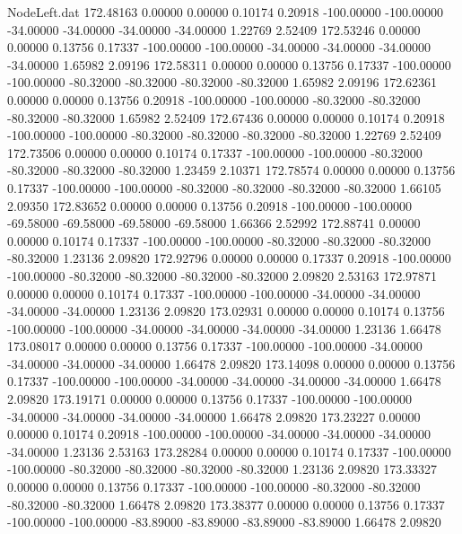 \begin{filecontents}{NodeLeft.dat}
 172.48163    0.00000    0.00000     0.10174    0.20918 -100.00000 -100.00000  -34.00000  -34.00000  -34.00000  -34.00000    1.22769    2.52409
 172.53246    0.00000    0.00000     0.13756    0.17337 -100.00000 -100.00000  -34.00000  -34.00000  -34.00000  -34.00000    1.65982    2.09196
 172.58311    0.00000    0.00000     0.13756    0.17337 -100.00000 -100.00000  -80.32000  -80.32000  -80.32000  -80.32000    1.65982    2.09196
 172.62361    0.00000    0.00000     0.13756    0.20918 -100.00000 -100.00000  -80.32000  -80.32000  -80.32000  -80.32000    1.65982    2.52409
 172.67436    0.00000    0.00000     0.10174    0.20918 -100.00000 -100.00000  -80.32000  -80.32000  -80.32000  -80.32000    1.22769    2.52409
 172.73506    0.00000    0.00000     0.10174    0.17337 -100.00000 -100.00000  -80.32000  -80.32000  -80.32000  -80.32000    1.23459    2.10371
 172.78574    0.00000    0.00000     0.13756    0.17337 -100.00000 -100.00000  -80.32000  -80.32000  -80.32000  -80.32000    1.66105    2.09350
 172.83652    0.00000    0.00000     0.13756    0.20918 -100.00000 -100.00000  -69.58000  -69.58000  -69.58000  -69.58000    1.66366    2.52992
 172.88741    0.00000    0.00000     0.10174    0.17337 -100.00000 -100.00000  -80.32000  -80.32000  -80.32000  -80.32000    1.23136    2.09820
 172.92796    0.00000    0.00000     0.17337    0.20918 -100.00000 -100.00000  -80.32000  -80.32000  -80.32000  -80.32000    2.09820    2.53163
 172.97871    0.00000    0.00000     0.10174    0.17337 -100.00000 -100.00000  -34.00000  -34.00000  -34.00000  -34.00000    1.23136    2.09820
 173.02931    0.00000    0.00000     0.10174    0.13756 -100.00000 -100.00000  -34.00000  -34.00000  -34.00000  -34.00000    1.23136    1.66478
 173.08017    0.00000    0.00000     0.13756    0.17337 -100.00000 -100.00000  -34.00000  -34.00000  -34.00000  -34.00000    1.66478    2.09820
 173.14098    0.00000    0.00000     0.13756    0.17337 -100.00000 -100.00000  -34.00000  -34.00000  -34.00000  -34.00000    1.66478    2.09820
 173.19171    0.00000    0.00000     0.13756    0.17337 -100.00000 -100.00000  -34.00000  -34.00000  -34.00000  -34.00000    1.66478    2.09820
 173.23227    0.00000    0.00000     0.10174    0.20918 -100.00000 -100.00000  -34.00000  -34.00000  -34.00000  -34.00000    1.23136    2.53163
 173.28284    0.00000    0.00000     0.10174    0.17337 -100.00000 -100.00000  -80.32000  -80.32000  -80.32000  -80.32000    1.23136    2.09820
 173.33327    0.00000    0.00000     0.13756    0.17337 -100.00000 -100.00000  -80.32000  -80.32000  -80.32000  -80.32000    1.66478    2.09820
 173.38377    0.00000    0.00000     0.13756    0.17337 -100.00000 -100.00000  -83.89000  -83.89000  -83.89000  -83.89000    1.66478    2.09820

\end{filecontents}
